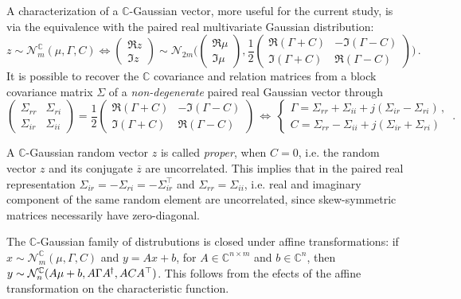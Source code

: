 \documentclass[a4paper,10pt]{article}
\newcommand{\cplx}{\mathbb{C}}
\newcommand{\hop}{{\mkern-1.5mu\dagger}}
\newcommand{\conj}[1]{\overline{#1}}
\begin{document}
A characterization of a $\cplx$-Gaussian vector, more useful for the current study, is via the
equivalence with the paired real multivariate Gaussian distribution:
\begin{equation}  \label{eq:cn-paired-real-density}
z \sim \mathcal{N}^{\cplx}_m(\mu, \Gamma, C)
  \Leftrightarrow
  \begin{pmatrix}
    \Re z \\ \Im z
  \end{pmatrix}
    \sim \mathcal{N}_{2 m}\biggl(
      \begin{pmatrix}
        \Re \mu \\ \Im \mu
      \end{pmatrix},
      \frac12
      \begin{pmatrix}
        \Re{(\Gamma + C)} & - \Im{(\Gamma - C)} \\
        \Im{(\Gamma + C)} &   \Re{(\Gamma - C)}
      \end{pmatrix}
    \biggr)
  \,.
\end{equation}
It is possible to recover the $\cplx$ covariance and relation matrices from a block covariance
matrix $\Sigma$ of a \textit{non-degenerate} paired real Gaussian vector through
$$
\begin{pmatrix}
  \Sigma_{rr} & \Sigma_{ri} \\ 
  \Sigma_{ir} & \Sigma_{ii} 
\end{pmatrix}
  = \frac12
    \begin{pmatrix}
      \Re{(\Gamma + C)} & - \Im{(\Gamma - C)} \\
      \Im{(\Gamma + C)} &   \Re{(\Gamma - C)}
    \end{pmatrix}
  \, \Leftrightarrow
  \,
  \begin{cases}
    \Gamma
      = \Sigma_{rr} + \Sigma_{ii} + j (\Sigma_{ir} - \Sigma_{ri})
    \,, \\
    C = \Sigma_{rr} - \Sigma_{ii} + j (\Sigma_{ir} + \Sigma_{ri}) 
  \end{cases}
  \,. $$

A $\cplx$-Gaussian random vector $z$ is called \textit{proper}, when $C = 0$, i.e.
the random vector $z$ and its conjugate $\conj{z}$ are uncorrelated. This implies
that in the paired real representation $
  \Sigma_{ir} = -\Sigma_{ri} = -\Sigma_{ir}^\top
$ and $\Sigma_{rr} = \Sigma_{ii}$, i.e. real and imaginary component of the same
random element are uncorrelated, since skew-symmetric matrices necessarily have
zero-diagonal.

The $\cplx$-Gaussian family of distrubutions is closed under affine transformations:
if $
  x \sim \mathcal{N}_m^{\cplx}(\mu, \Gamma, C)
$ and $y = A x + b$, for $
  A \in \cplx^{n\times m}
$ and $b \in \cplx^{n}$, then$
  y \sim \mathcal{N}_n^{\cplx}(A\mu + b, A \Gamma A^\hop, A C A^\top)
$. This follows from the efects of the affine transformation on the characteristic
function.
\end{document}
